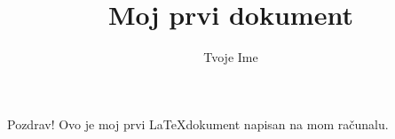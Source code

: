 \documentclass{article}
\title{Moj prvi dokument}
\author{Tvoje Ime}
\begin{document}
\maketitle
Pozdrav! Ovo je moj prvi \LaTeX dokument napisan na mom računalu.
\end{document}
